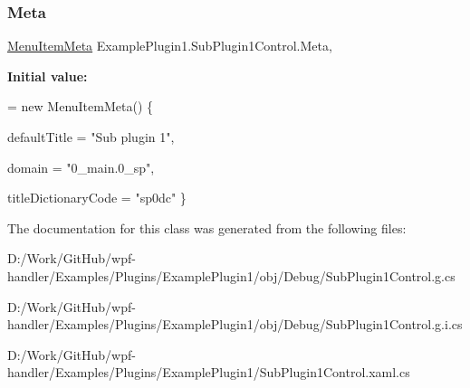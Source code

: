 \subsubsection{\texorpdfstring{Meta}{Meta}}
{\footnotesize\ttfamily \mbox{\hyperlink{class_wpf_handler_1_1_plugins_1_1_menu_item_meta}{Menu\+Item\+Meta}} Example\+Plugin1.\+Sub\+Plugin1\+Control.\+Meta\hspace{0.3cm}{\ttfamily [get]}, {\ttfamily [set]}}

{\bfseries Initial value\+:}
\begin{DoxyCode}
= \textcolor{keyword}{new} MenuItemMeta()
        \{
            
            defaultTitle = \textcolor{stringliteral}{"Sub plugin 1"},

            
            domain = \textcolor{stringliteral}{"0\_main.0\_sp"},

            
            titleDictionaryCode = \textcolor{stringliteral}{"sp0dc"}
        \}
\end{DoxyCode}


The documentation for this class was generated from the following files\+:\begin{DoxyCompactItemize}
\item 
D\+:/\+Work/\+Git\+Hub/wpf-\/handler/\+Examples/\+Plugins/\+Example\+Plugin1/obj/\+Debug/Sub\+Plugin1\+Control.\+g.\+cs\item 
D\+:/\+Work/\+Git\+Hub/wpf-\/handler/\+Examples/\+Plugins/\+Example\+Plugin1/obj/\+Debug/Sub\+Plugin1\+Control.\+g.\+i.\+cs\item 
D\+:/\+Work/\+Git\+Hub/wpf-\/handler/\+Examples/\+Plugins/\+Example\+Plugin1/Sub\+Plugin1\+Control.\+xaml.\+cs\end{DoxyCompactItemize}
